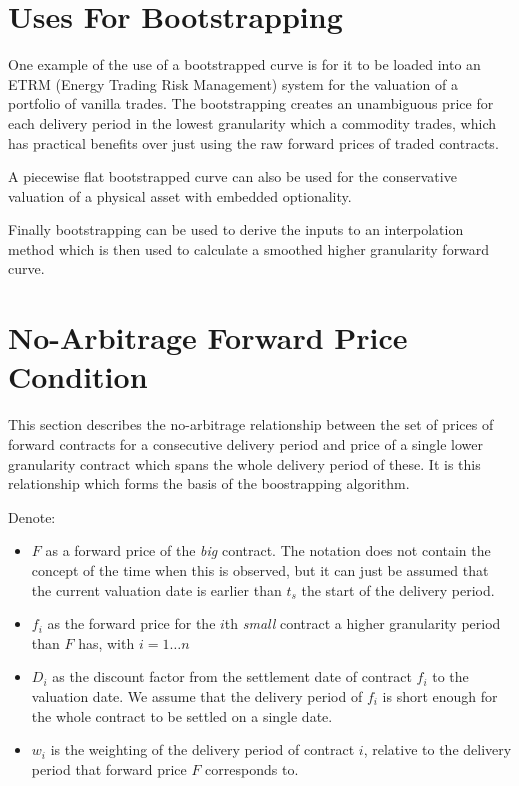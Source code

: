 \documentclass{article}
\begin{document}

\section{Uses For Bootstrapping}

One example of the use of a bootstrapped curve is for it to be loaded into an ETRM
(Energy Trading Risk Management) system for the valuation of a portfolio of vanilla
trades. The bootstrapping creates an unambiguous price for each delivery period in the
lowest granularity which a commodity trades, which has practical benefits over just
using the raw forward prices of traded contracts.

A piecewise flat bootstrapped curve can also be used for the conservative valuation
of a physical asset with embedded optionality.


Finally bootstrapping can be used to derive the inputs to an interpolation method which
is then used to calculate a smoothed higher granularity forward curve.


\section{No-Arbitrage Forward Price Condition}
This section describes the no-arbitrage relationship between the set of prices of forward contracts
for a consecutive delivery period and price of a single lower granularity contract which spans 
the whole delivery period of these. It is this relationship which forms the basis of the boostrapping
algorithm.

Denote:
\begin{itemize}
    \item $F$ as a forward price of the \emph{big} contract.
    The notation does not contain the concept of the
    time when this is observed, but it can just be assumed that the current valuation 
    date is earlier than $t_s$ the start of the delivery period.
    \item $f_i$ as the forward price for the $i$th \emph{small} contract a higher granularity 
    period than $F$ has, with $i=1\dots n$
    \item $D_i$ as the discount factor from the settlement date of contract $f_i$ to the 
    valuation date. We assume that the delivery period of $f_i$ is short enough for 
    the whole contract to be settled on a single date.
    \item $w_i$ is the weighting of the delivery period of contract $i$, relative to
    the delivery period that forward price $F$ corresponds to.
\end{itemize}
\end{document}
